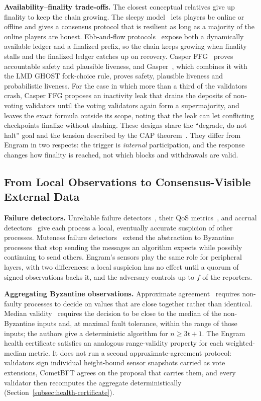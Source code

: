 \textbf{Availability--finality trade-offs.}
The closest conceptual relatives give up finality to keep the chain growing.
The sleepy model~\cite{pass2017sleepy} lets players be online or offline and
gives a consensus protocol that is resilient as long as a majority of the online
players are honest.
Ebb-and-flow protocols~\cite{neu2021ebbflow} expose both a dynamically
available ledger and a finalized prefix, so the chain keeps growing when
finality stalls and the finalized ledger catches up on recovery. Casper
FFG~\cite{buterin2017casper} proves accountable safety and plausible liveness, and
Gasper~\cite{buterin2020gasper}, which combines it with the LMD GHOST fork-choice rule, proves safety, plausible
liveness and probabilistic liveness. For the case in which more than a third of the validators
crash, Casper FFG proposes an inactivity leak that drains the deposits of
non-voting validators until the voting validators again form a supermajority,
and leaves the exact formula outside its scope, noting that the leak can let conflicting checkpoints finalize without slashing. These designs share the
``degrade, do not halt'' goal and the tension described by the CAP
theorem~\cite{gilbert2002cap}. They differ from Engram in two respects: the
trigger is \emph{internal} participation, and the response changes how finality
is reached, not which blocks and withdrawals are valid.

\subsection{From Local Observations to Consensus-Visible External Data}
\label{subsec:rw-detect}
\textbf{Failure detectors.}
Unreliable failure detectors~\cite{chandra1996unreliable}, their QoS
metrics~\cite{chen2002qos}, and accrual detectors~\cite{hayashibara2004phi}
give each process a local, eventually accurate suspicion of other processes.
Muteness failure detectors~\cite{doudou1999muteness} extend the abstraction to
Byzantine processes that stop sending the messages an algorithm expects while
possibly continuing to send others. Engram's
sensors play the same role for peripheral layers, with two differences:
a local suspicion has no effect until a quorum of signed observations backs it, and the adversary
controls up to $f$ of the reporters.

\textbf{Aggregating Byzantine observations.}
Approximate agreement~\cite{dolev1986approximate} requires non-faulty
processes to decide on values that are close together rather than identical.
Median validity~\cite{stolz2015median} requires the decision to be close to the
median of the non-Byzantine inputs and, at maximal fault tolerance,
within the range of those inputs; the authors give a deterministic algorithm for $n \geq 3t+1$. The Engram health
certificate satisfies an analogous range-validity property for each
weighted-median metric. It does not run a second approximate-agreement
protocol: validators sign individual height-bound sensor snapshots carried as
vote extensions, CometBFT agrees on the proposal that carries them, and every
validator then recomputes the aggregate deterministically
(Section~\ref{subsec:health-certificate}).

